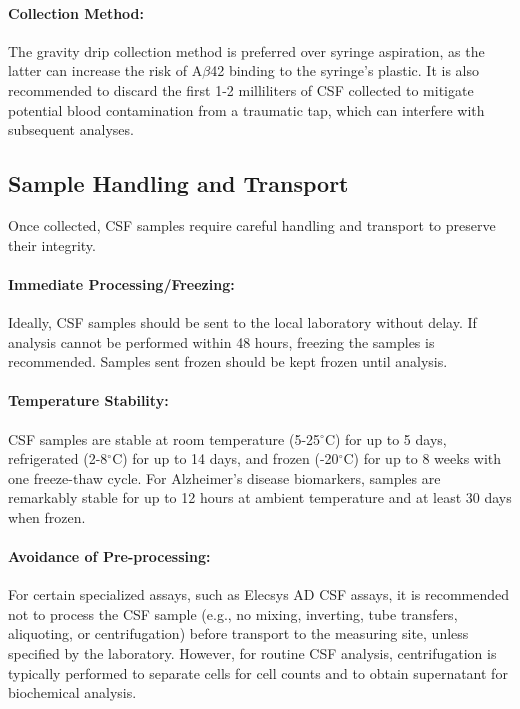 \paragraph{Collection Method:} The gravity drip collection method is preferred over syringe aspiration, as the latter can increase the risk of A$\beta$42 binding to the syringe's plastic. It is also recommended to discard the first 1-2 milliliters of CSF collected to mitigate potential blood contamination from a traumatic tap, which can interfere with subsequent analyses.
	
\subsection{Sample Handling and Transport}
	
Once collected, CSF samples require careful handling and transport to preserve their integrity.
	
\paragraph{Immediate Processing/Freezing:} Ideally, CSF samples should be sent to the local laboratory without delay. If analysis cannot be performed within 48 hours, freezing the samples is recommended. Samples sent frozen should be kept frozen until analysis.
	
\paragraph{Temperature Stability:} CSF samples are stable at room temperature (5-25$^{\circ}$C) for up to 5 days, refrigerated (2-8$^{\circ}$C) for up to 14 days, and frozen (-20$^{\circ}$C) for up to 8 weeks with one freeze-thaw cycle. For Alzheimer's disease biomarkers, samples are remarkably stable for up to 12 hours at ambient temperature and at least 30 days when frozen.
	
\paragraph{Avoidance of Pre-processing:} For certain specialized assays, such as Elecsys AD CSF assays, it is recommended not to process the CSF sample (e.g., no mixing, inverting, tube transfers, aliquoting, or centrifugation) before transport to the measuring site, unless specified by the laboratory. However, for routine CSF analysis, centrifugation is typically performed to separate cells for cell counts and to obtain supernatant for biochemical analysis.
	
